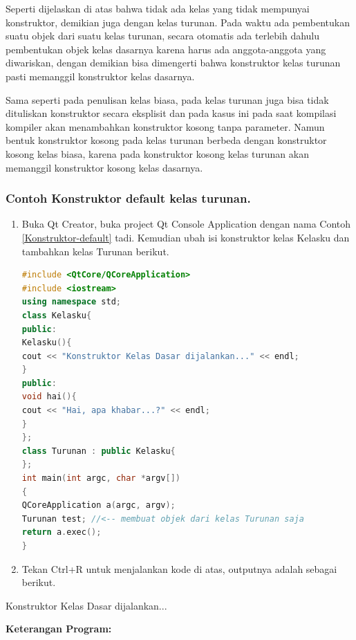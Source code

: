 Seperti dijelaskan di atas bahwa tidak ada kelas yang tidak mempunyai
konstruktor, demikian juga dengan kelas turunan. Pada waktu ada
pembentukan suatu objek dari suatu kelas turunan, secara otomatis ada
terlebih dahulu pembentukan objek kelas dasarnya karena harus ada
anggota-anggota yang diwariskan, dengan demikian bisa dimengerti bahwa
konstruktor kelas turunan pasti memanggil konstruktor kelas dasarnya.

Sama seperti pada penulisan kelas biasa, pada kelas turunan juga bisa
tidak dituliskan konstruktor secara eksplisit dan pada kasus ini pada
saat kompilasi kompiler akan menambahkan konstruktor kosong tanpa
parameter. Namun bentuk konstruktor kosong pada kelas turunan berbeda
dengan konstruktor kosong kelas biasa, karena pada konstruktor kosong
kelas turunan akan memanggil konstruktor kosong kelas dasarnya.

\subsubsection*{Contoh Konstruktor default kelas turunan.}

\begin{enumerate}

\item
  Buka Qt Creator, buka project Qt Console Application dengan nama
  Contoh \ref{Konstruktor-default} tadi. Kemudian ubah isi konstruktor kelas Kelasku dan
  tambahkan kelas Turunan berikut.

\begin{lstlisting}[language=c++, caption=Konstruktor default kelas turunan, label=Konstruktor-default-kelas-turunan]
#include <QtCore/QCoreApplication>
#include <iostream>
using namespace std;
class Kelasku{
public:
Kelasku(){
cout << "Konstruktor Kelas Dasar dijalankan..." << endl;
}
public:
void hai(){
cout << "Hai, apa khabar...?" << endl;
}
};
class Turunan : public Kelasku{
};
int main(int argc, char *argv[])
{
QCoreApplication a(argc, argv);
Turunan test; //<-- membuat objek dari kelas Turunan saja
return a.exec();
}
\end{lstlisting}
\item
  Tekan Ctrl+R untuk menjalankan kode di atas, outputnya adalah sebagai
  berikut.
\end{enumerate}

\begin{lcverbatim}
Konstruktor Kelas Dasar dijalankan...
\end{lcverbatim}


\textbf{Keterangan Program:}

